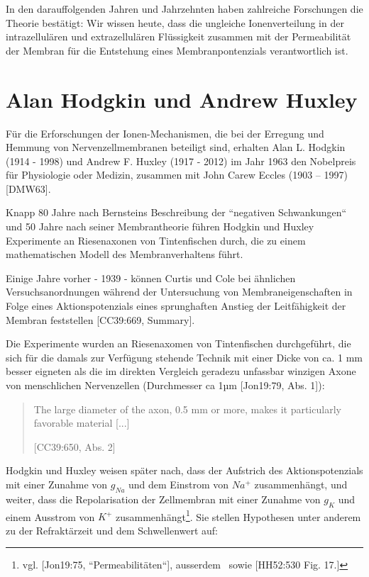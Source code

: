 In den darauffolgenden Jahren und Jahrzehnten haben zahlreiche Forschungen die Theorie bestätigt: Wir wissen heute, dass die ungleiche Ionenverteilung in der intrazellulären und extrazellulären Flüssigkeit zusammen mit der Permeabilität der Membran für die Entstehung eines Membranpontenzials verantwortlich ist.

\section{Alan Hodgkin und Andrew Huxley}\label{appendix:hodgkinhuxley}

Für die Erforschungen der Ionen-Mechanismen, die bei der Erregung und Hemmung von Nervenzellmembranen beteiligt sind, erhalten Alan L. Hodgkin (1914 - 1998) und Andrew F. Huxley (1917 - 2012) im Jahr 1963 den Nobelpreis für Physiologie oder Medizin, zusammen mit John Carew Eccles (1903 – 1997) {[DMW63]}.

Knapp 80 Jahre nach Bernsteins Beschreibung der ``negativen Schwankungen`` und 50 Jahre nach seiner Membrantheorie führen Hodgkin und Huxley Experimente an Riesenaxonen von Tintenfischen durch, die zu einem mathematischen Modell des Membranverhaltens führt.

Einige Jahre vorher - 1939 - können Curtis und Cole bei ähnlichen Versuchsanordnungen während der Untersuchung von Membraneigenschaften in Folge eines Aktionspotenzials eines sprunghaften Anstieg der Leitfähigkeit der Membran feststellen [CC39:669, Summary].

Die Experimente wurden an Riesenaxomen von Tintenfischen durchgeführt, die sich für die damals zur Verfügung stehende Technik mit einer Dicke von ca. 1 mm besser eigneten als die im direkten Vergleich geradezu unfassbar winzigen Axone von menschlichen Nervenzellen (Durchmesser ca 1µm {[Jon19:79, Abs. 1]}):

\blockquote[{[CC39:650, Abs. 2]}]{
    The large diameter of the axon, 0.5 mm or more, makes it particularly favorable material {[...]}
}

Hodgkin und Huxley weisen später nach, dass der Aufstrich des Aktionspotenzials mit einer Zunahme von $g_{Na}$ und dem Einstrom von $Na^+$ zusammenhängt, und weiter, dass die Repolarisation der Zellmembran mit einer Zunahme von $g_K$ und einem Ausstrom von $K^+$ zusammenhängt\footnote{
    vgl. {[Jon19:75, ``Permeabilitäten``]}, ausserdem~\cite[96]{BCP18} sowie {[HH52:530 Fig. 17.]}
}.
Sie stellen Hypothesen unter anderem zu der Refraktärzeit und dem Schwellenwert auf:\\

